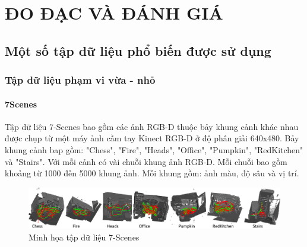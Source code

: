 \chapter{ĐO ĐẠC VÀ ĐÁNH GIÁ}

\section{Một số tập dữ liệu phổ biến được sử dụng}
\subsection{Tập dữ liệu phạm vi vừa - nhỏ}
\subsubsection*{7Scenes}
Tập dữ liệu 7-Scenes \cite{6619221} bao gồm các ảnh RGB-D thuộc bảy khung cảnh khác nhau được chụp từ một máy ảnh cầm tay Kinect RGB-D ở độ phân giải 640x480. Bảy khung cảnh bap gồm: "Chess", "Fire", "Heads", "Office", "Pumpkin", "RedKitchen" và "Stairs". Với mỗi cảnh có vài chuỗi khung ảnh RGB-D. Mỗi chuỗi bao gồm khoảng từ 1000 đến 5000 khung ảnh. Mỗi khung gồm: ảnh màu, độ sâu và vị trí.
\begin{figure}[H]
    \centering
    \includegraphics[width=\textwidth]{pics/Chapter2/7scenes.png}
    \caption{Minh họa tập dữ liệu 7-Scenes \cite{6619221}}
\end{figure}
